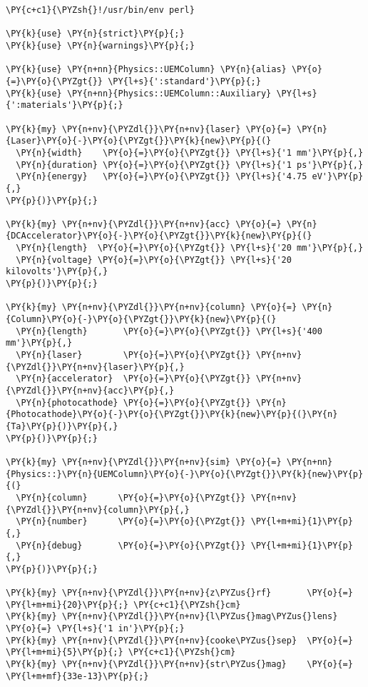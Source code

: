 \begin{Verbatim}[commandchars=\\\{\}]
\PY{c+c1}{\PYZsh{}!/usr/bin/env perl}

\PY{k}{use} \PY{n}{strict}\PY{p}{;}
\PY{k}{use} \PY{n}{warnings}\PY{p}{;}

\PY{k}{use} \PY{n+nn}{Physics::UEMColumn} \PY{n}{alias} \PY{o}{=}\PY{o}{\PYZgt{}} \PY{l+s}{':standard'}\PY{p}{;}
\PY{k}{use} \PY{n+nn}{Physics::UEMColumn::Auxiliary} \PY{l+s}{':materials'}\PY{p}{;}

\PY{k}{my} \PY{n+nv}{\PYZdl{}}\PY{n+nv}{laser} \PY{o}{=} \PY{n}{Laser}\PY{o}{-}\PY{o}{\PYZgt{}}\PY{k}{new}\PY{p}{(}
  \PY{n}{width}    \PY{o}{=}\PY{o}{\PYZgt{}} \PY{l+s}{'1 mm'}\PY{p}{,}
  \PY{n}{duration} \PY{o}{=}\PY{o}{\PYZgt{}} \PY{l+s}{'1 ps'}\PY{p}{,}
  \PY{n}{energy}   \PY{o}{=}\PY{o}{\PYZgt{}} \PY{l+s}{'4.75 eV'}\PY{p}{,}
\PY{p}{)}\PY{p}{;}

\PY{k}{my} \PY{n+nv}{\PYZdl{}}\PY{n+nv}{acc} \PY{o}{=} \PY{n}{DCAccelerator}\PY{o}{-}\PY{o}{\PYZgt{}}\PY{k}{new}\PY{p}{(}
  \PY{n}{length}  \PY{o}{=}\PY{o}{\PYZgt{}} \PY{l+s}{'20 mm'}\PY{p}{,}
  \PY{n}{voltage} \PY{o}{=}\PY{o}{\PYZgt{}} \PY{l+s}{'20 kilovolts'}\PY{p}{,}
\PY{p}{)}\PY{p}{;}

\PY{k}{my} \PY{n+nv}{\PYZdl{}}\PY{n+nv}{column} \PY{o}{=} \PY{n}{Column}\PY{o}{-}\PY{o}{\PYZgt{}}\PY{k}{new}\PY{p}{(}
  \PY{n}{length}       \PY{o}{=}\PY{o}{\PYZgt{}} \PY{l+s}{'400 mm'}\PY{p}{,} 
  \PY{n}{laser}        \PY{o}{=}\PY{o}{\PYZgt{}} \PY{n+nv}{\PYZdl{}}\PY{n+nv}{laser}\PY{p}{,}
  \PY{n}{accelerator}  \PY{o}{=}\PY{o}{\PYZgt{}} \PY{n+nv}{\PYZdl{}}\PY{n+nv}{acc}\PY{p}{,}
  \PY{n}{photocathode} \PY{o}{=}\PY{o}{\PYZgt{}} \PY{n}{Photocathode}\PY{o}{-}\PY{o}{\PYZgt{}}\PY{k}{new}\PY{p}{(}\PY{n}{Ta}\PY{p}{)}\PY{p}{,}
\PY{p}{)}\PY{p}{;}

\PY{k}{my} \PY{n+nv}{\PYZdl{}}\PY{n+nv}{sim} \PY{o}{=} \PY{n+nn}{Physics::}\PY{n}{UEMColumn}\PY{o}{-}\PY{o}{\PYZgt{}}\PY{k}{new}\PY{p}{(}
  \PY{n}{column}      \PY{o}{=}\PY{o}{\PYZgt{}} \PY{n+nv}{\PYZdl{}}\PY{n+nv}{column}\PY{p}{,}
  \PY{n}{number}      \PY{o}{=}\PY{o}{\PYZgt{}} \PY{l+m+mi}{1}\PY{p}{,}
  \PY{n}{debug}       \PY{o}{=}\PY{o}{\PYZgt{}} \PY{l+m+mi}{1}\PY{p}{,}
\PY{p}{)}\PY{p}{;}

\PY{k}{my} \PY{n+nv}{\PYZdl{}}\PY{n+nv}{z\PYZus{}rf}       \PY{o}{=} \PY{l+m+mi}{20}\PY{p}{;} \PY{c+c1}{\PYZsh{}cm}
\PY{k}{my} \PY{n+nv}{\PYZdl{}}\PY{n+nv}{l\PYZus{}mag\PYZus{}lens} \PY{o}{=} \PY{l+s}{'1 in'}\PY{p}{;}
\PY{k}{my} \PY{n+nv}{\PYZdl{}}\PY{n+nv}{cooke\PYZus{}sep}  \PY{o}{=} \PY{l+m+mi}{5}\PY{p}{;} \PY{c+c1}{\PYZsh{}cm}
\PY{k}{my} \PY{n+nv}{\PYZdl{}}\PY{n+nv}{str\PYZus{}mag}    \PY{o}{=} \PY{l+m+mf}{33e-13}\PY{p}{;}


\end{Verbatim}
